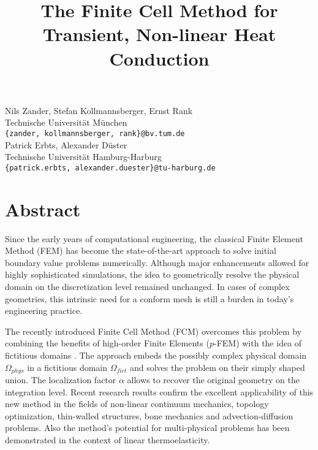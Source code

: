 \title{The Finite Cell Method for Transient, Non-linear Heat Conduction}
 \author{} \institute{}
\maketitle
\begin{center}

{\large Nils Zander, Stefan Kollmannsberger, Ernst Rank}\\
Technische Universit\"{a}t M\"{u}nchen\\
{\tt \{zander, kollmannsberger, rank\}@bv.tum.de}\\
\vspace{6mm}
{\large Patrick Erbts, Alexander D\"{u}ster}\\
Technische Universit\"{a}t Hamburg-Harburg\\
{\tt \{patrick.erbts, alexander.duester\}@tu-harburg.de}
\\



\end{center}

\section*{Abstract}

Since the early years of computational engineering, the classical Finite
Element Method (FEM) has become the state-of-the-art approach to solve initial
boundary value problems numerically. 
Although major enhancements allowed for highly sophisticated
simulations, the idea to geometrically
resolve the physical domain on the discretization level remained unchanged.
In cases of complex geometries, this intrinsic need for a conform mesh
is still a burden in today's engineering practice.


The recently introduced Finite Cell Method (FCM) overcomes this problem by
combining the benefits of high-order Finite Elements ($p$-FEM) with the idea of
fictitious domains \cite{Parvizian:07.1}.
The approach embeds  the possibly complex physical domain $\Omega_{phys}$
in a fictitious domain $\Omega_{fict}$ and solves the problem on their simply
shaped union. 
The localization factor $\alpha$ allows to recover the original geometry on the 
integration level. 
Recent research results confirm the excellent applicability
of this new method in the fields of
non-linear continuum mechanics, 
topology optimization, 
thin-walled structures, 
bone mechanics
and advection-diffusion problems.
Also the method's potential for multi-physical problems has been demonstrated
in the context of linear thermoelasticity.


